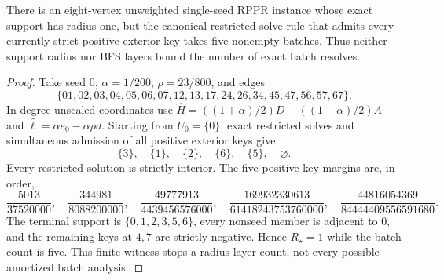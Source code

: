 \begin{proposition}
\label{prop:aesp-cd-all-positive-radius-stop}
There is an eight-vertex unweighted single-seed RPPR instance whose exact
support has radius one, but the canonical restricted-solve rule that admits
every currently strict-positive exterior key takes five nonempty batches.
Thus neither support radius nor BFS layers bound the number of exact batch
resolves.
\end{proposition}

\begin{proof}
Take seed $0$, $\alpha=1/200$, $\rho=23/800$, and edges
\begin{equation*}
 \{01,02,03,04,05,06,07,12,13,17,24,26,34,45,47,56,57,67\}.
\end{equation*}
In degree-unscaled coordinates use
$\widehat H=((1+\alpha)/2)D-((1-\alpha)/2)A$ and
$\widehat\ell=\alpha e_0-\alpha\rho d$.  Starting from $U_0=\{0\}$,
exact restricted solves and simultaneous admission of all positive exterior
keys give
\begin{equation*}
 \{3\},\quad\{1\},\quad\{2\},\quad\{6\},\quad\{5\},\quad\varnothing.
\end{equation*}
Every restricted solution is strictly interior.  The five positive key
margins are, in order,
\begin{equation*}
 \frac{5013}{37520000},\quad
 \frac{344981}{8088200000},\quad
 \frac{49777913}{4439456576000},\quad
 \frac{169932330613}{61418243753760000},\quad
 \frac{44816054369}{84444409556591680}.
\end{equation*}
The terminal support is $\{0,1,2,3,5,6\}$, every nonseed member is adjacent
to $0$, and the remaining keys at $4,7$ are strictly negative.  Hence
$R_\star=1$ while the batch count is five.  This finite witness stops a
radius-layer count, not every possible amortized batch analysis.
\end{proof}
